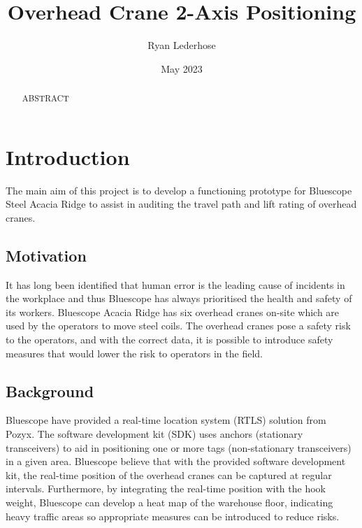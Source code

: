 \documentclass[12pt, a4paper]{article}
\title{Overhead Crane 2-Axis Positioning}
\author{Ryan Lederhose}
\date{May 2023}
\begin{document}
\maketitle
\thispagestyle{empty}

\newpage
\thispagestyle{empty}

\begin{abstract}
ABSTRACT
\end{abstract}

\newpage


\tableofcontents
\thispagestyle{empty}

\newpage

\thispagestyle{empty}
\listoffigures
\listoftables

\newpage

\section{Introduction}
The main aim of this project is to develop a functioning prototype for Bluescope Steel Acacia Ridge to assist in auditing the travel path and lift rating of overhead cranes. 
\subsection{Motivation}
It has long been identified that human error is the leading cause of incidents in the workplace and thus Bluescope has always prioritised the health and safety of its workers. 
Bluescope Acacia Ridge has six overhead cranes on-site which are used by the operators to move steel coils. The overhead cranes pose a safety risk to the operators, 
and with the correct data, it is possible to introduce safety measures that would lower the risk to operators in the field.
\subsection{Background}
Bluescope have provided a real-time location system (RTLS) solution from Pozyx. The software development kit (SDK) uses anchors (stationary transceivers) 
to aid in positioning one or more tags (non-stationary transceivers) in a given area. Bluescope believe that with the provided software development kit, the 
real-time position of the overhead cranes can be captured at regular intervals. Furthermore, by integrating the real-time position with the hook weight, 
Bluescope can develop a heat map of the warehouse floor, indicating heavy traffic areas so appropriate measures can be introduced to reduce risks.
\end{document}
